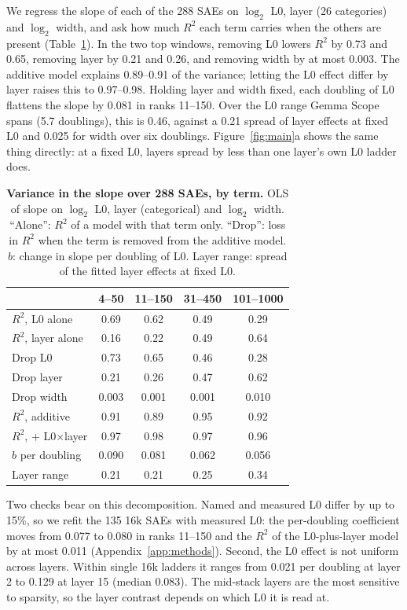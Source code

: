 \documentclass[10pt,twocolumn]{article}
\begin{document}
We regress the slope of each of the 288 SAEs on $\log_2$ L0, layer (26 categories) and $\log_2$ width, and ask how much $R^2$ each term carries when the others are present (Table~\ref{tab:decomp}). In the two top windows, removing L0 lowers $R^2$ by 0.73 and 0.65, removing layer by 0.21 and 0.26, and removing width by at most 0.003. The additive model explains 0.89--0.91 of the variance; letting the L0 effect differ by layer raises this to 0.97--0.98. Holding layer and width fixed, each doubling of L0 flattens the slope by 0.081 in ranks 11--150. Over the L0 range Gemma Scope spans (5.7 doublings), this is 0.46, against a 0.21 spread of layer effects at fixed L0 and 0.025 for width over six doublings. Figure~\ref{fig:main}a shows the same thing directly: at a fixed L0, layers spread by less than one layer's own L0 ladder does.

\begin{table}[t]
\centering
\small
\caption{\textbf{Variance in the slope over 288 SAEs, by term.} OLS of slope on $\log_2$ L0, layer (categorical) and $\log_2$ width. ``Alone'': $R^2$ of a model with that term only. ``Drop'': loss in $R^2$ when the term is removed from the additive model. $b$: change in slope per doubling of L0. Layer range: spread of the fitted layer effects at fixed L0.}
\label{tab:decomp}
\begin{tabular}{lcccc}
\toprule
 & 4--50 & 11--150 & 31--450 & 101--1000 \\
\midrule
$R^2$, L0 alone & 0.69 & 0.62 & 0.49 & 0.29 \\
$R^2$, layer alone & 0.16 & 0.22 & 0.49 & 0.64 \\
Drop L0 & 0.73 & 0.65 & 0.46 & 0.28 \\
Drop layer & 0.21 & 0.26 & 0.47 & 0.62 \\
Drop width & 0.003 & 0.001 & 0.001 & 0.010 \\
$R^2$, additive & 0.91 & 0.89 & 0.95 & 0.92 \\
$R^2$, + L0$\times$layer & 0.97 & 0.98 & 0.97 & 0.96 \\
$b$ per doubling & 0.090 & 0.081 & 0.062 & 0.056 \\
Layer range & 0.21 & 0.21 & 0.25 & 0.34 \\
\bottomrule
\end{tabular}
\end{table}

Two checks bear on this decomposition. Named and measured L0 differ by up to 15\%, so we refit the 135 16k SAEs with measured L0: the per-doubling coefficient moves from 0.077 to 0.080 in ranks 11--150 and the $R^2$ of the L0-plus-layer model by at most 0.011 (Appendix~\ref{app:methods}). Second, the L0 effect is not uniform across layers. Within single 16k ladders it ranges from 0.021 per doubling at layer 2 to 0.129 at layer 15 (median 0.083). The mid-stack layers are the most sensitive to sparsity, so the layer contrast depends on which L0 it is read at.
\end{document}
